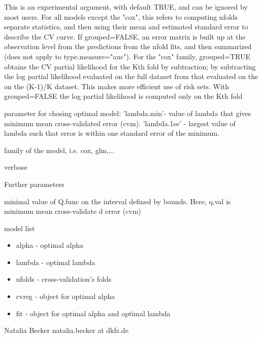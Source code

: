 \documentclass[letterpaper]{book}
\begin{document}
\begin{Arguments}
\begin{ldescription}
\item[\code{grouped}]  This is an experimental argument, with default TRUE, and can be ignored by most users. For all models except the "cox", this refers to computing nfolds separate statistics, and then using their mean and estimated standard error to describe the CV curve. If grouped=FALSE, an error matrix is built up at the observation level from the predictions from the nfold fits, and then summarized (does not apply to type.measure="auc"). For the "cox" family, grouped=TRUE obtains the CV partial likelihood for the Kth fold by subtraction; by subtracting the log partial likelihood evaluated on the full dataset from that evaluated on the on the (K-1)/K dataset. This makes more efficient use of risk sets. With grouped=FALSE the log partial likelihood is computed only on the Kth fold
\item[\code{type.min}] parameter for chosing optimal model: 'lambda.min'- value of lambda that gives minimum mean cross-validated error (cvm).
'lambda.1se' - largest value of lambda such that error is within one standard error of the minimum.
\item[\code{family}] family of the model, i.e. cox, glm,...
\item[\code{verbose}] verbose  
\item[\code{...}] Further parameters
\end{ldescription}
\end{Arguments}
%
\begin{Value}
\begin{ldescription}
\item[\code{q.val }] minimal value of Q.func on the interval defined by bounds. Here, q.val is  minimum mean cross-validate               d error (cvm)
\item[\code{model }]  model list
\begin{itemize}

\item alpha -  optimal alpha
\item lambda - optimal lambda
\item nfolds - cross-validation's folds
\item cvreg -   object for optimal alpha 
\item fit -  object for optimal alpha and optimal lambda 

\end{itemize}
 



\end{ldescription}
\end{Value}
%
\begin{Author}\relax
Natalia Becker  natalia.becker at dkfz.de 
\end{Author}
%
\begin{SeeAlso}\relax
{}
\end{SeeAlso}
\printindex{}
\end{document}
